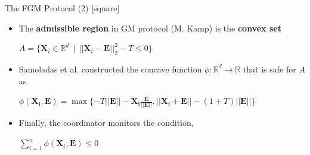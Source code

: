 \begin{frame}{The FGM Protocol (2)}
    [square]
    \begin{itemize}
        \item{The \textbf{admissible region} in GM protocol (M. Kamp) is the \textbf{convex set}
        \newline
        \begin{center}
            $A=\{\pmb{X}_i\in\mathbb{R}^d\:\:|\:\:||\pmb{X}_i-\pmb{E}||_2^2 - T \leq 0\}$
        \end{center}
        }
        \vspace{0.4cm}
        \item{Samoladas et al. constructed the concave function $\phi:\mathbb{R}^d\rightarrow\mathbb{R}$ that is safe for $A$ as
        \newline
        \begin{center}
            $\phi(\pmb{X_i},\pmb{E}) = \max\{-T||\pmb{E}|| - \pmb{X_i}\frac{\pmb{E}}{\pmb{||E||}}, ||\pmb{X_i}+\pmb{E}|| - (1+T)||\pmb{E}||\}$
        \end{center}
        }
        \vspace{0.4cm}
        \item{Finally, the coordinator monitors the condition,
        \newline
        \begin{center}
            $\sum_{i=1}^n\phi(\pmb{X}_i,\pmb{E}) \leq 0$
        \end{center}
        }
    \end{itemize}
\end{frame}


